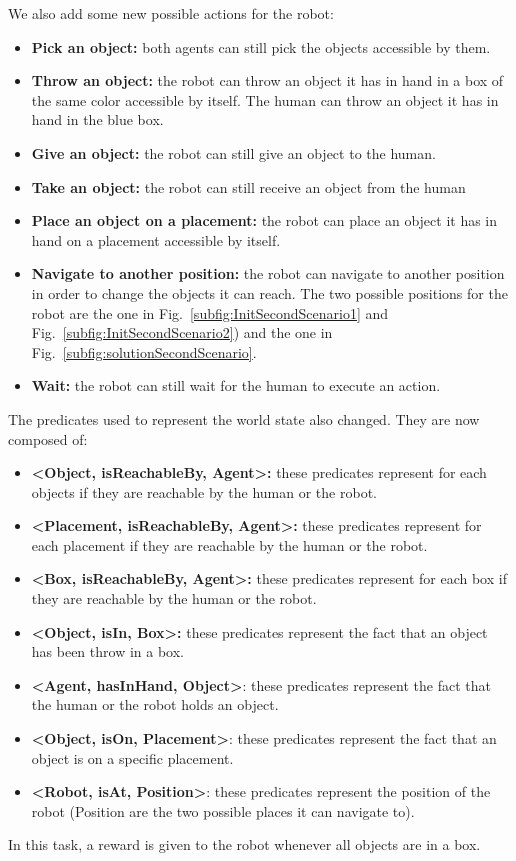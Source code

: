 \documentclass[english,a4paper,11pt,twoside]{StyleThese}
\begin{document}
We also add some new possible actions for the robot:
\begin{itemize}
\item \textbf{Pick an object:} both agents can still pick the objects accessible by them.
\item \textbf{Throw an object:} the robot can throw an object it has in hand in a box of the same color accessible by itself. The human can throw an object it has in hand in the blue box. 
\item \textbf{Give an object:} the robot can still give an object to the human.
\item \textbf{Take an object:} the robot can still receive an object from the human
\item \textbf{Place an object on a placement:} the robot can place an object it has in hand on a placement accessible by itself.
\item \textbf{Navigate to another position:} the robot can navigate to another position in order to change the objects it can reach. The two possible positions for the robot are the one in Fig.~\ref{subfig:InitSecondScenario1} and Fig.~\ref{subfig:InitSecondScenario2}) and the one in Fig.~\ref{subfig:solutionSecondScenario}.
\item \textbf{Wait:} the robot can still wait for the human to execute an action.
\end{itemize}
The predicates used to represent the world state also changed. They are now composed of:
\begin{itemize}
\item \textbf{<Object, isReachableBy, Agent>:} these predicates represent for each objects if they are reachable by the human or the robot.
\item \textbf{<Placement, isReachableBy, Agent>:} these predicates represent for each placement if they are reachable by the human or the robot.
\item \textbf{<Box, isReachableBy, Agent>:} these predicates represent for each box if they are reachable by the human or the robot.
\item \textbf{<Object, isIn, Box>:} these predicates represent the fact that an object has been throw in a box.
\item \textbf{<Agent, hasInHand, Object>}: these predicates represent the fact that the human or the robot holds an object.
\item \textbf{<Object, isOn, Placement>}: these predicates represent the fact that an object is on a specific placement.
\item \textbf{<Robot, isAt, Position>}: these predicates represent the position of the robot (Position are the two possible places it can navigate to).
\end{itemize}
In this task, a reward is given to the robot whenever all objects are in a box.
\end{document}
